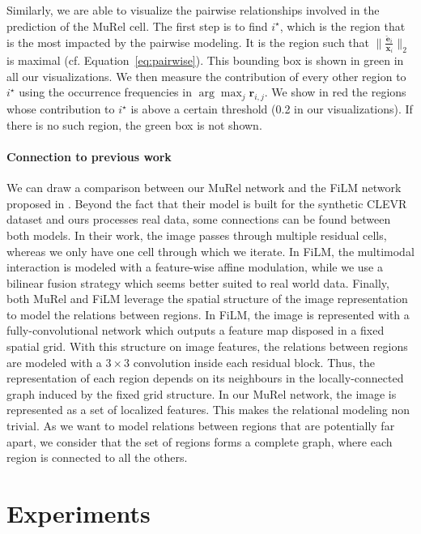 \documentclass[10pt,twocolumn,letterpaper]{article}
\begin{document}
Similarly, we are able to visualize the pairwise relationships involved in the prediction of the MuRel cell. The first step is to find $i^\star$, which is the region that is the most impacted by the pairwise modeling. It is the region such that $\|\frac{\check{\bm{e}}_i}{\bm{x}_i} \|_2$ is maximal (cf. Equation~\eqref{eq:pairwise}). This bounding box is shown in green in all our visualizations. We then measure the contribution of every other region to $i^\star$ using the occurrence frequencies in $\arg\!\max_j \bm{r}_{i,j}$. We show in red the regions whose contribution to $i^\star$ is above a certain threshold (0.2 in our visualizations). If there is no such region, the green box is not shown.

\paragraph{Connection to previous work}
We can draw a comparison between our MuRel network and the FiLM network proposed in \cite{perez2018film}. 
Beyond the fact that their model is built for the synthetic CLEVR dataset \cite{johnson2016clevr} and ours processes real data, some connections can be found between both models.
In their work, the image passes through multiple residual cells, whereas we only have one cell through which we iterate. In FiLM, the multimodal interaction is modeled with a feature-wise affine modulation, while we use a bilinear fusion strategy \cite{benyounescadene2017mutan} which seems better suited to real world data. 
Finally, both MuRel and FiLM leverage the spatial structure of the image representation to model the relations between regions.
In FiLM, the image is represented with a fully-convolutional network which outputs a feature map disposed in a fixed spatial grid. With this structure on image features, the relations between regions are modeled with a $3 \times 3$ convolution inside each residual block. Thus, the representation of each region depends on its neighbours in the locally-connected graph induced by the fixed grid structure. 
In our MuRel network, the image is represented as a set of localized features. This makes the relational modeling non trivial. As we want to model relations between regions that are potentially far apart, we consider that the set of regions forms a complete graph, where each region is connected to all the others.  \section{Experiments}
\end{document}
